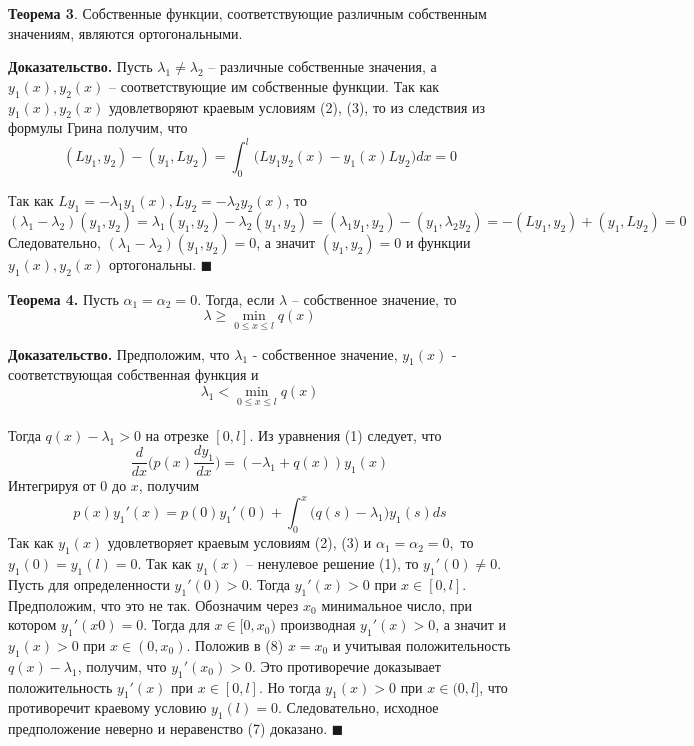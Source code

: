 \textbf{Теорема 3}. Собственные функции, соответствующие различным собственным значениям, являются ортогональными.

\textbf{Доказательство.} Пусть $\lambda_1 \neq \lambda_2$ – различные собственные значения, а $y_1(x), y_2(x)$ – соответствующие им собственные функции. Так как $y_1(x), y_2(x)$ удовлетворяют краевым условиям (2), (3), то из следствия
из формулы Грина получим, что
\begin{equation}\nonumber
(Ly_1,y_2)-(y_1,Ly_2)= \int_{0}^{l}\big( Ly_1 y_2(x) - y_1(x) Ly_2 \big) dx = 0
\end{equation}

Так как $Ly_1 = -\lambda_1y_1(x), Ly_2 = -\lambda_2y_2(x)$, то
\begin{equation}\nonumber
(\lambda_1-\lambda_2)(y_1,y_2)=\lambda_1(y_1,y_2)-\lambda_2(y_1,y_2)=(\lambda_1 y_1,y_2)-(y_1,\lambda_2 y_2)=-(Ly_1,y_2)+(y_1,Ly_2)=0
\end{equation}
Следовательно, $(\lambda_1 - \lambda_2)(y_1, y_2) = 0$, а значит $(y_1, y_2) = 0$ и функции
$y_1(x), y_2(x)$ ортогональны. $\blacksquare$

\textbf{Теорема 4.} Пусть $\alpha_1 = \alpha_2 = 0$. Тогда, если $\lambda$ – собственное значение, то
\begin{equation}
    \lambda \geq \min_{0 \leq x \leq l} q(x)
\end{equation}

\textbf{Доказательство.} Предположим, что $\lambda_1$ - собственное значение, $y_1(x)$
- соответствующая собственная функция и
\begin{equation}\nonumber
\lambda_1 < \min_{0 \leq x \leq l} q(x)
\end{equation}
\\Тогда $q(x)- \lambda_1 > 0$ на отрезке $[0, l]$. Из уравнения (1) следует, что
\begin{equation}\nonumber
\frac{d}{d x} \Big( p(x) \frac{d y_1}{d x} \Big) = (-\lambda_1+q(x))y_1(x)
\end{equation}
Интегрируя от $0$ до $x$, получим
\begin{equation}
    p(x)y_1'(x) = p(0)y_1'(0) + \int_{0}^{x}\big(q(s)-\lambda_1\big)y_1(s)ds
\end{equation}
Так как $y_1(x)$ удовлетворяет краевым условиям (2), (3) и $\alpha_1 =
\alpha_2 = 0,$ то $y_1(0) = y_1(l) = 0$. Так как $y_1(x)$ – ненулевое решение (1), то
$y_1'(0) \neq 0$. Пусть для определенности $y_1'(0)>0$. Тогда $y_1'(x)>0$ при
$x \in [0, l]$. Предположим, что это не так. Обозначим через $x_0$ минимальное
число, при котором $y_1'(x0) = 0$. Тогда для $x \in [0, x_0)$ производная $y_1'(x) >
0$, а значит и $y_1(x) > 0$ при $x \in (0, x_0)$. Положив в (8) $x = x_0$ и
учитывая положительность $q(x) - \lambda_1$, получим, что $y_1'(x_0) > 0$. Это
противоречие доказывает положительность $y_1'(x)$ при $x \in [0, l]$. Но тогда
$y_1(x) > 0$ при $x \in (0, l]$, что противоречит краевому условию $y_1(l) = 0$.
Следовательно, исходное предположение неверно и неравенство (7) доказано. $\blacksquare$

